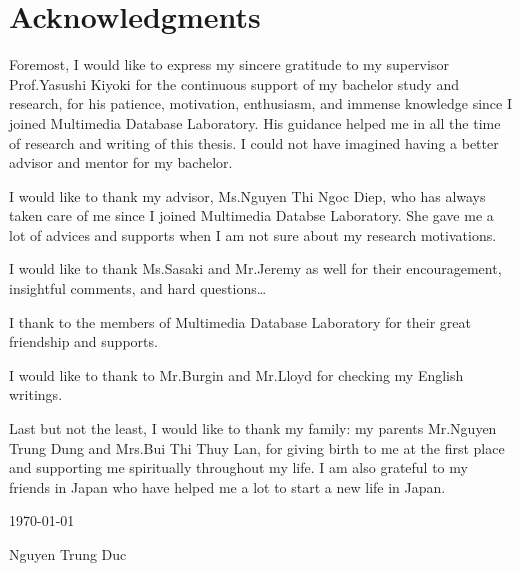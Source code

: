 \chapter*{Acknowledgments}

Foremost, I would like to express my sincere gratitude to my supervisor Prof.Yasushi Kiyoki for the continuous support of my bachelor study and research, for his patience, motivation, enthusiasm, and immense knowledge since I joined Multimedia Database Laboratory. His guidance helped me in all the time of research and writing of this thesis. I could not have imagined having a better advisor and mentor for my bachelor.

I would like to thank my advisor, Ms.Nguyen Thi Ngoc Diep, who has always taken care of me since I joined Multimedia Databse Laboratory. She gave me a lot of advices and supports when I am not sure about my research motivations. 

I would like to thank Ms.Sasaki and Mr.Jeremy as well for their encouragement, insightful comments, and hard questions\ldots

I thank to the members of Multimedia Database Laboratory for their great friendship and supports.

I would like to thank to Mr.Burgin and Mr.Lloyd for checking my English writings.

Last but not the least, I would like to thank my family: my parents Mr.Nguyen Trung Dung and Mrs.Bui Thi Thuy Lan, for giving birth to me at the first place and supporting me spiritually throughout my life. I am also grateful to my friends in Japan who have helped me a lot to start a new life in Japan. 

\begin{flushright}
\today

Nguyen Trung Duc 
\end{flushright}
